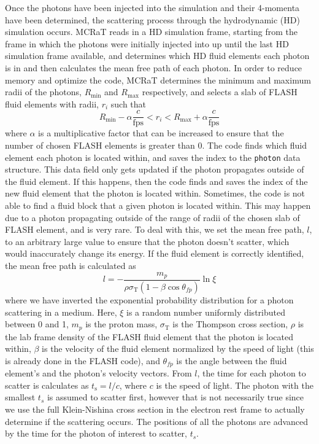 \documentclass[12pt,a4paper]{article}
\begin{document}
Once the photons have been injected into the simulation and their 4-momenta have been determined, the scattering process through the hydrodynamic (HD) simulation occurs. MCRaT reads in a HD simulation frame, starting from the frame in which the photons were initially injected into up until the last HD simulation frame available, and determines which HD fluid elements each photon is in and then calculates the mean free path of each photon. In order to reduce memory and optimize the code, MCRaT determines the minimum and maximum radii of the photons, $R_\mathrm{min}$ and $R_\mathrm{max}$ respectively, and selects a slab of FLASH fluid elements with radii, $r_i$ such that 
\[
R_\mathrm{min}-\alpha\frac{c}{\mathrm{fps}} < r_i < R_\mathrm{max}+\alpha\frac{c}{\mathrm{fps}} 
\] 
where $\alpha$ is a multiplicative factor that can be increased to ensure that the number of chosen FLASH elements is greater than 0. The code finds which fluid element each photon is located within, and saves the index to the \texttt{photon} data structure. This data field only gets updated if the photon propagates outside of the fluid element. If this happens, then the code finds and saves the index of the new fluid element that the photon is located within. Sometimes, the code is not able to find a fluid block that a given photon is located within. This may happen due to a photon propagating outside of the range of radii of the chosen slab of FLASH element, and is very rare. To deal with this, we set the mean free path, $l$, to an arbitrary large value to ensure that the photon doesn't scatter, which would inaccurately change its energy. If the fluid element is correctly identified, the mean free path is calculated as  
\[
l=-\frac{m_p}{\rho\sigma_\mathrm{T}(1-\beta\cos\theta_{fp})}\ln\xi
\]
where we have inverted the exponential probability distribution for a photon scattering in a medium. Here, $\xi$ is a random number uniformly distributed between 0 and 1, $m_p$ is the proton mass, $\sigma_\mathrm{T}$ is the Thompson cross section, $\rho$ is the lab frame density of the FLASH fluid element that the photon is located within, $\beta$ is the velocity of the fluid element normalized by the speed of light (this is already done in the FLASH code), and $\theta_{fp}$ is the angle between the fluid element's and the photon's velocity vectors. From $l$, the time for each photon to scatter is calculates as $t_\mathrm{s}=l/c$, where $c$ is the speed of light. The photon with the smallest $t_s$ is assumed to scatter first, however that is not necessarily true since we use the full Klein-Nishina cross section in the electron rest frame to actually determine if the scattering occurs. The positions of all the photons are advanced by the time for the photon of interest to scatter, $t_s$.
\end{document}
